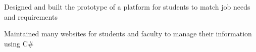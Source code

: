 \begin{myexp}
   \begin{mybullet}
      \item Designed and built the prototype of a platform for students to match job needs and requirements
      \item Maintained many websites for students and faculty to manage their information using C\#
   \end{mybullet}
\end{myexp}
